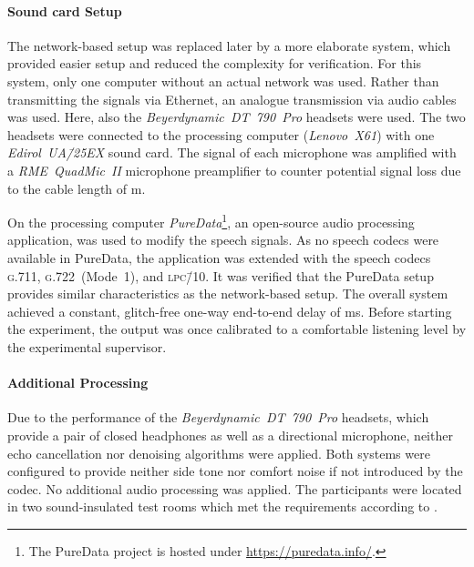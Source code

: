 \paragraph*{Sound card Setup}
The network-based setup was replaced later by a more elaborate system, which provided easier setup and reduced the complexity for verification.
For this system, only one computer without an actual network was used.
Rather than transmitting the signals via Ethernet, an analogue transmission via audio cables was used.
Here, also the \emph{Beyerdynamic~DT~790~Pro} headsets were used.
The two headsets were connected to the processing computer (\emph{Lenovo~X61}) with one \emph{Edirol~UA\=/25EX} sound card.
The signal of each microphone was amplified with a \emph{RME~QuadMic~II} microphone preamplifier to counter potential signal loss due to the cable length of \unit[10]{m}.

On the processing computer \emph{PureData}\footnote{The PureData project is hosted under \url{https://puredata.info/}.}, an open-source audio processing application, was used to modify the speech signals.
As no speech codecs were available in PureData, the application was extended with the speech codecs \textsc{\lowercase{G.711}}, \textsc{\lowercase{G.722}}~(Mode~1), and \textsc{\lowercase{LPC\=/10}}.
It was verified that the PureData setup provides similar characteristics as the network-based setup.
The overall system achieved a constant, glitch-free one-way end-to-end delay of \unit[70]{ms}.
Before starting the experiment, the output was once calibrated to a comfortable listening level by the experimental supervisor.

\paragraph*{Additional Processing}
Due to the performance of the \emph{Beyerdynamic~DT~790~Pro} headsets, which provide a pair of closed headphones as well as a directional microphone, neither echo cancellation nor denoising algorithms were applied.
Both systems were configured to provide neither side tone nor comfort noise if not introduced by the codec.
No additional audio processing was applied.
The participants were located in two sound-insulated test rooms which met the requirements according to \citet{itu-t_recommendation_p.800_methods_1996}.


